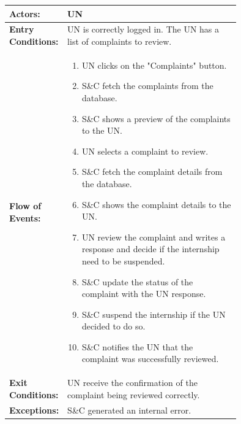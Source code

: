 \begin{center}
    \begin{longtable}{|l|p{0.75\linewidth}|}
        \hline
        \textbf{Actors:}           & UN                                                                                                                \\
        \hline
        \textbf{Entry Conditions:} & UN is correctly logged in. The UN has a list of complaints to review.                                                    \\
        \hline
        \textbf{Flow of Events:}   & \begin{enumerate}
            \item UN clicks on the "Complaints" button.
            \item S\&C fetch the complaints from the database.
            \item S\&C shows a preview of the complaints to the UN.
            \item UN selects a complaint to review.
            \item S\&C fetch the complaint details from the database.
            \item S\&C shows the complaint details to the UN.
            \item UN review the complaint and writes a response and decide if the internship need to be suspended.
            \item S\&C update the status of the complaint with the UN response.
            \item S\&C suspend the internship if the UN decided to do so.
            \item S\&C notifies the UN that the complaint was successfully reviewed.                             
                                     \end{enumerate} \\
        \hline
        \textbf{Exit Conditions:}  & UN receive the confirmation of the complaint being reviewed correctly.                                               \\
        \hline
        \textbf{Exceptions:}       & S\&C generated an internal error.                                                                                     \\
        \hline
    \end{longtable}
\end{center}

